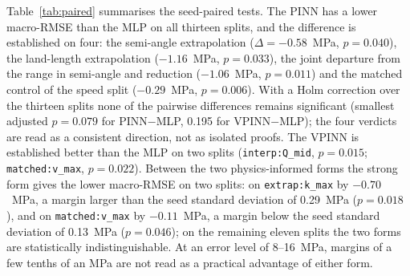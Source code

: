 Table~\ref{tab:paired} summarises the seed-paired tests. The PINN has a lower macro-RMSE than the MLP on all thirteen splits, and the difference is established on four: the semi-angle extrapolation ($\Delta=-0.58$~MPa, $p=0.040$), the land-length extrapolation ($-1.16$~MPa, $p=0.033$), the joint departure from the range in semi-angle and reduction ($-1.06$~MPa, $p=0.011$) and the matched control of the speed split ($-0.29$~MPa, $p=0.006$). With a Holm correction \cite{TODO-holm-1979} over the thirteen splits none of the pairwise differences remains significant (smallest adjusted $p = 0.079$ for PINN$-$MLP, 0.195 for VPINN$-$MLP); the four verdicts are read as a consistent direction, not as isolated proofs. %
The VPINN is established better than the MLP on two splits (\texttt{interp:Q\_mid}, $p=0.015$; \texttt{matched:v\_max}, $p=0.022$). Between the two physics-informed forms the strong form gives the lower macro-RMSE on two splits: on \texttt{extrap:k\_max} by $-0.70$~MPa, a margin larger than the seed standard deviation of 0.29~MPa ($p=0.018$), and on \texttt{matched:v\_max} by $-0.11$~MPa, a margin below the seed standard deviation of 0.13~MPa ($p=0.046$); on the remaining eleven splits the two forms are statistically indistinguishable. At an error level of 8--16~MPa, margins of a few tenths of an MPa are not read as a practical advantage of either form. %
